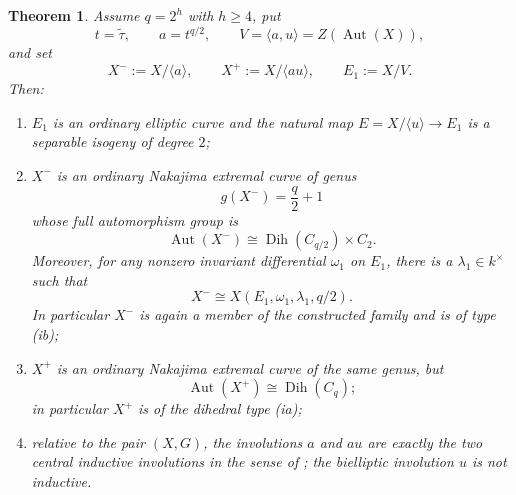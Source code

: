 \documentclass[11pt]{article}
\newtheorem{theorem}{Theorem}[section]
\theoremstyle{remark}
\newcommand{\Aut}{\operatorname{Aut}}
\newcommand{\Dih}{\operatorname{Dih}}
\begin{document}
\begin{theorem}\label{thm:centralquotients}
Assume $q=2^h$ with $h\ge4$, put
\[
 t=\widetilde\tau,\qquad a=t^{q/2},\qquad
 V=\langle a,u\rangle=Z(\Aut(X)),
\]
and set
\[
 X^-:=X/\langle a\rangle,\qquad
 X^+:=X/\langle au\rangle,\qquad
 E_1:=X/V.
\]
Then:
\begin{enumerate}[label=\textup{(\roman*)}]
\item $E_1$ is an ordinary elliptic curve and the natural map
      $E=X/\langle u\rangle\to E_1$ is a separable isogeny of degree $2$;
\item $X^-$ is an ordinary Nakajima extremal curve of genus
\[
 g(X^-)=\frac q2+1
\]
whose full automorphism group is
\[
 \Aut(X^-)\cong \Dih(C_{q/2})\times C_2.
\]
Moreover, for any nonzero invariant differential $\omega_1$ on $E_1$,
there is a $\lambda_1\in k^\times$ such that
\[
 X^-\cong X(E_1,\omega_1,\lambda_1,q/2).
\]
In particular $X^-$ is again a member of the constructed family and is of
type \textup{(ib)};
\item $X^+$ is an ordinary Nakajima extremal curve of the same genus, but
\[
 \Aut(X^+)\cong \Dih(C_q);
\]
in particular $X^+$ is of the dihedral type \textup{(ia)};
\item relative to the pair $(X,G)$, the involutions $a$ and $au$ are
      exactly the two central inductive involutions in the sense of
      \cite{GK2015}; the bielliptic involution $u$ is not inductive.
\end{enumerate}
\end{theorem}
\end{document}
